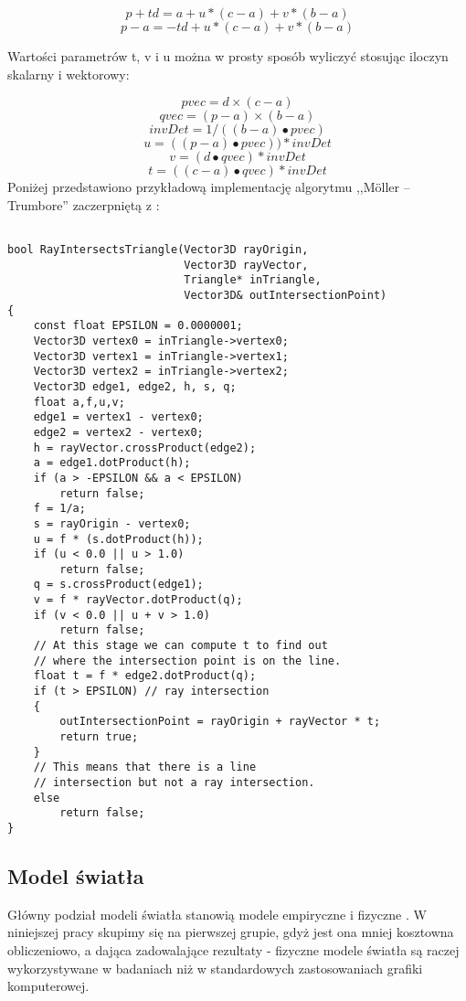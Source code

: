$$p + td = a + u * (c - a) + v * (b - a)$$
$$p - a = -td + u * (c - a) + v * (b - a)$$

Wartości parametrów t, v i u można w prosty sposób wyliczyć stosując iloczyn skalarny i wektorowy:

$$pvec = d \times (c - a)$$
$$qvec = (p - a) \times (b - a)$$
$$invDet = 1/((b - a) \bullet pvec)$$
$$u = ((p - a) \bullet pvec)) * invDet$$
$$v = (d \bullet qvec) * invDet$$
$$t = ((c - a) \bullet qvec) * invDet$$
Poniżej przedstawiono przykładową implementację algorytmu ,,Möller – Trumbore'' zaczerpniętą z \cite{wikiMoll}:

\begin{lstlisting}

bool RayIntersectsTriangle(Vector3D rayOrigin, 
                           Vector3D rayVector, 
                           Triangle* inTriangle,
                           Vector3D& outIntersectionPoint)
{
    const float EPSILON = 0.0000001; 
    Vector3D vertex0 = inTriangle->vertex0;
    Vector3D vertex1 = inTriangle->vertex1;  
    Vector3D vertex2 = inTriangle->vertex2;
    Vector3D edge1, edge2, h, s, q;
    float a,f,u,v;
    edge1 = vertex1 - vertex0;
    edge2 = vertex2 - vertex0;
    h = rayVector.crossProduct(edge2);
    a = edge1.dotProduct(h);
    if (a > -EPSILON && a < EPSILON)
        return false;
    f = 1/a;
    s = rayOrigin - vertex0;
    u = f * (s.dotProduct(h));
    if (u < 0.0 || u > 1.0)
        return false;
    q = s.crossProduct(edge1);
    v = f * rayVector.dotProduct(q);
    if (v < 0.0 || u + v > 1.0)
        return false;
    // At this stage we can compute t to find out
    // where the intersection point is on the line.
    float t = f * edge2.dotProduct(q);
    if (t > EPSILON) // ray intersection
    {
        outIntersectionPoint = rayOrigin + rayVector * t; 
        return true;
    }
    // This means that there is a line
    // intersection but not a ray intersection.
    else 
        return false;
}

\end{lstlisting}



\subsection{Model światła}

Główny podział modeli światła stanowią modele empiryczne i fizyczne \cite{suffern2007, falski2004}. W niniejszej pracy skupimy się na pierwszej grupie, gdyż jest ona mniej kosztowna obliczeniowo, a dająca zadowalające rezultaty - fizyczne modele światła są raczej wykorzystywane w badaniach niż w standardowych zastosowaniach grafiki komputerowej.


